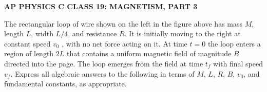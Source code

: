 \documentclass{../../../oss-apphys-exam}
\begin{document}

\begin{center}
  \textbf{AP PHYSICS C CLASS 19: MAGNETISM, PART 3}
\end{center}
  

\begin{questions}
  \question The rectangular loop of wire shown on the left in the figure above
  has mass $M$, length $L$, width $L/4$, and resistance $R$. It is initially
  moving to the right at constant speed $v_0$ , with no net force acting on
  it. At time $t=0$ the loop enters a region of length $2L$ that contains a
  uniform magnetic field of magnitude $B$ directed into the page. The loop
  emerges from the field at time $t_f$ with final speed $v_f$. Express all
  algebraic answers to the following in terms of $M$, $L$, $R$, $B$, $v_0$,
  and fundamental constants, as appropriate.
\end{questions}
\end{document}
